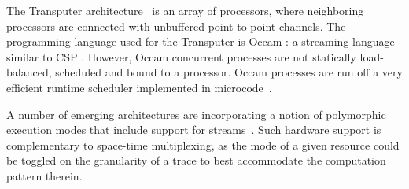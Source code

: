 The Transputer architecture~\cite{transputer88} is an array of
processors, where neighboring processors are connected with unbuffered
point-to-point channels.  The programming language used for the
Transputer is Occam \cite{occammanual}: a streaming language similar
to CSP \cite{Hoare78}.  However, Occam concurrent processes are not
statically load-balanced, scheduled and bound to a processor. Occam
processes are run off a very efficient runtime scheduler implemented
in microcode~\cite{may87communicating}.  

A number of emerging architectures are incorporating a notion of
polymorphic execution modes that include support for
streams~\cite{trips-isca03,smartmemories,m3t}.  Such hardware support
is complementary to space-time multiplexing, as the mode of a given
resource could be toggled on the granularity of a trace to best
accommodate the computation pattern therein.

%
